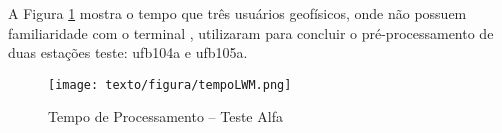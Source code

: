     A Figura \ref{teste1} mostra o tempo que três usuários geofísicos, onde não possuem familiaridade com o terminal , utilizaram para concluir o pré-processamento de duas estações teste: ufb104a e ufb105a.
    
    \begin{figure}[H]
        \caption{Tempo de Processamento -- Teste Alfa}
            \begin{center}
                \texttt{[image: texto/figura/tempoLWM.png]}
            \end{center}
        \label{teste1}
    \end{figure}
    
    
    
